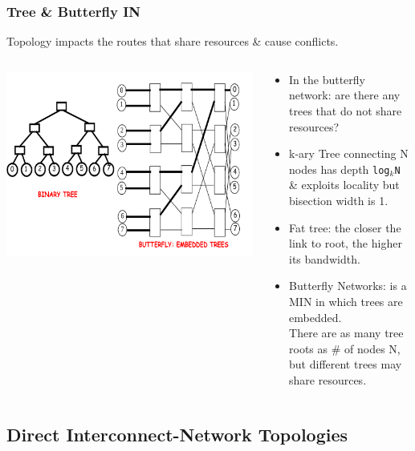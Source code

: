 \documentclass{beamer}
\newcommand{\emp}[1]{\textcolor{DikuRed}{ #1}}
\begin{document}
\begin{frame}[fragile,t]
\frametitle{Tree \& Butterfly IN}

Topology impacts the routes that share resources \& cause conflicts.

\medskip

\begin{columns}
\includegraphics[width=48ex]{Figures/FigsInterconnect/BTreeButerfly}
\begin{scriptsize}
\begin{itemize}
    \item \alert{In the butterfly network: are there any trees that do not share resources?}\pause
    \item \emp{k-ary Tree} connecting N nodes has depth {\tt log$_k$N} \& exploits locality
                 but \alert{bisection width is 1.}\\
    \item \emp{Fat tree}: the closer the link to root, the higher its bandwidth. 
    \item \emp{Butterfly Networks}: is a MIN in which trees are embedded.\\
            There are as many tree roots as \# of nodes N, but different trees
            may share resources.
\end  {itemize}
\end{scriptsize}
\end{columns}

\end{frame}


\subsection{Direct Interconnect-Network Topologies}
\begin{frame}[fragile]
	\tableofcontents[currentsubsection]
\end{frame}
\end{document}
